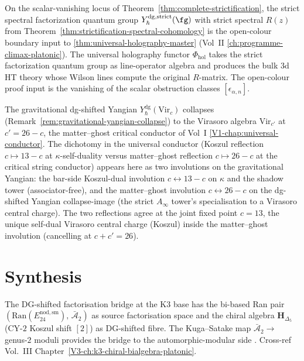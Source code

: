 \begin{remark}
\label{rem:dg-shifted-bridge-uhm-bridge}
On the scalar-vanishing locus of
Theorem~\ref{thm:complete-strictification}, the strict spectral
factorization quantum group $Y^{\mathrm{dg,strict}}_\hbar(\fg)$ with
strict spectral $R(z)$ from
Theorem~\ref{thm:strictification-spectral-cohomology} is the
open-colour boundary input to \cref{thm:universal-holography-master}
(Vol~II \cref{ch:programme-climax-platonic}). The universal holography
functor $\Phi_{\mathrm{hol}}$ takes the strict factorization quantum
group as line-operator algebra and produces the bulk $3$d HT theory
whose Wilson lines compute the original $R$-matrix. The open-colour
proof input is the vanishing of the scalar obstruction classes
$[\epsilon_{\alpha,n}]$.
\end{remark}

\begin{remark}
\label{rem:dg-shifted-bridge-conductor-bridge}
The gravitational dg-shifted Yangian
$Y^{\mathrm{dg}}_\hbar(\mathrm{Vir}_c)$ collapses
(Remark~\ref{rem:gravitational-yangian-collapse}) to the Virasoro
algebra $\mathrm{Vir}_{c'}$ at $c' = 26 - c$, the matter--ghost
critical conductor of Vol~I \cref{V1-chap:universal-conductor}. The
dichotomy in the universal conductor (Koszul reflection
$c \mapsto 13 - c$ at $\kappa$-self-duality versus matter--ghost
reflection $c\mapsto 26-c$ at the critical string conductor) appears
here as two involutions on the gravitational Yangian: the bar-side
Koszul-dual involution $c\leftrightarrow 13-c$ on $\kappa$ and the
shadow tower (associator-free), and the matter--ghost involution
$c\leftrightarrow 26-c$ on the dg-shifted Yangian collapse-image (the
strict $A_\infty$ tower's specialisation to a Virasoro central
charge). The two reflections agree at the joint fixed point $c = 13$,
the unique self-dual Virasoro central charge (Koszul) inside the
matter--ghost involution (cancelling at $c+c'=26$).
\end{remark}

\section{Synthesis}
\label{sec:dgsfb-supplement}

\begin{remark}
\label{rem:dgsfb-1}
The DG-shifted factorisation bridge at the K3 base has
the bi-based Ran pair $(\mathrm{Ran}(E^{\mathrm{nod,sm}}_{24}),\,\bar{\mathcal A}_2)$
as source factorisation space and the chiral algebra $\mathbf H_{\Delta_5}$
(CY-$2$ Koszul shift $[2]$) as DG-shifted fibre. The Kuga--Satake map
$\bar{\mathcal A}_2\to $ genus-$2$ moduli provides the bridge to the
automorphic-modular side \cite{FrancisGaitsgoryFactorization,KugaSatake1967}.
Cross-ref Vol.~III Chapter~\ref{V3-ch:k3-chiral-bialgebra-platonic}.
\end{remark}

